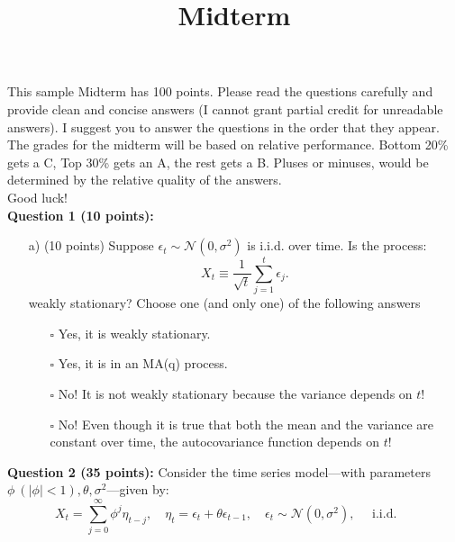 \documentclass[12] {article}
\begin{document}
\onehalfspace

\title{Midterm}
\maketitle

This sample Midterm has 100 points. Please read the questions carefully and provide clean and concise answers (I cannot grant partial credit for unreadable answers). I suggest you to answer the questions in the order that they appear.  \\

The grades for the midterm will be based on relative performance. Bottom 20\% gets a C, Top 30\% gets an A, the rest gets a B. Pluses or minuses, would be determined by the relative quality of the answers. \\

Good luck! \\





\noindent \textbf{Question 1 (10 points):} \\ 

\begin{itemize}
\item [a)] (10 points) Suppose $\epsilon_t \sim \mathcal{N}(0,\sigma^2)$ is i.i.d. over time. Is the process:
\[X_t \equiv \frac{1}{\sqrt{t}} \sum_{j=1}^{t} \epsilon_j. \]
weakly stationary? Choose one (and only one) of the following answers

\begin{itemize}
\item [$\square$] Yes, it is weakly stationary. 
\item [$\square$] Yes, it is in an MA(q) process.
\item [$\square$] No! It is not weakly stationary because the variance depends on $t$!
\item [$\square$] No! Even though it is true that both the mean and the variance are constant over time, the autocovariance function depends on $t$! 
\end{itemize}

\end{itemize}




\noindent \textbf{Question 2 (35 points):} Consider the time series model---with parameters $\phi \: (|\phi|<1), \theta, \sigma^2$---given by:
\begin{equation}
X_t=  \sum_{j=0}^{\infty} \phi^j \eta_{t-j}, \quad \eta_t = \epsilon_{t} + \theta \epsilon_{t-1}, \quad \epsilon_t \sim \mathcal{N}(0,\sigma^2), \quad \textrm{ i.i.d. }\quad 
\end{equation}
\end{document}

